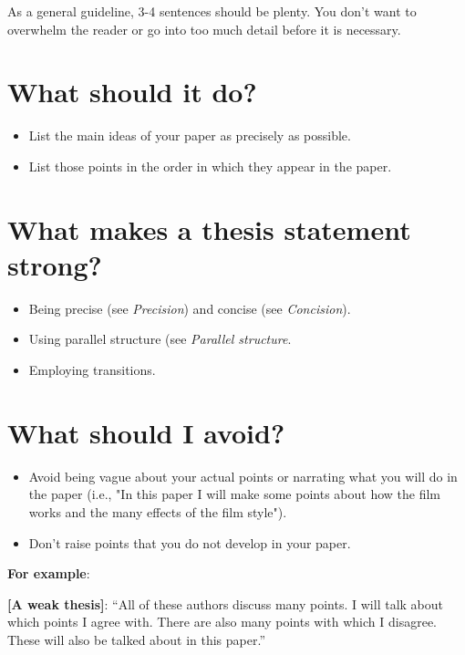 As a general guideline, 3-4 sentences should be plenty. You don't want to overwhelm 
the reader or go into too much detail before it is necessary.

\section{What should it do?}

\begin{itemize}
\item List the main ideas of your paper as precisely as possible.

\item List those points in the order in which they appear in the paper.

\end{itemize}

\section{What makes a thesis statement strong?}

\begin{itemize}
\item Being precise (see \emph{Precision}) and concise (see \emph{Concision}).

\item Using parallel structure (see \emph{Parallel structure}.

\item Employing transitions.
\end{itemize}

\section{What should I avoid?}

\begin{itemize}
\item Avoid being vague about your actual points or narrating what you will do in the 
paper (i.e., "In this paper I will make some points about how the film works and the 
many effects of the film style").

\item Don't raise points that you do not develop in your paper.

\end{itemize}

\textbf{For example}:

\textbf{[A weak thesis]}:  “All of these authors discuss many points. I will talk about 
which points I agree with. There are also many points with which I disagree. These will 
also be talked about in this paper.”


